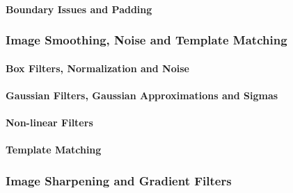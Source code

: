 \paragraph{Boundary Issues and Padding} 
\label{booksection_31_Boundary_Issues_and_Padding}

\subsubsection{Image Smoothing, Noise and Template Matching} 
\label{booksection_32_Image_Smoothing_Noise_and_Template_Matching}
\paragraph{Box Filters, Normalization and Noise} 
\label{booksection_33_Box_Filters_Normalization_and_Noise}

\paragraph{Gaussian Filters, Gaussian Approximations and Sigmas} 
\label{booksection_34_Gaussian_Filters_Gaussian_Approximations_and_Sigmas}

\paragraph{Non-linear Filters} 
\label{booksection_35_Non-linear_Filters}

\paragraph{Template Matching} 
\label{booksection_36_Template_Matching}

\subsubsection{Image Sharpening and Gradient Filters} 
\label{booksection_37_Image_Sharpening_and_Gradient_Filters}
